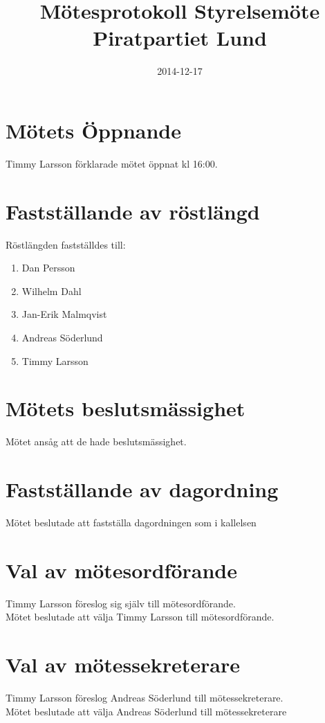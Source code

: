 \documentclass[a4paper,10pt]{article}
\title{\vspace{-1.5in}\textmd{\textbf{Mötesprotokoll Styrelsemöte Piratpartiet Lund}}}
\date{2014-12-17}
\author{}
\begin{document}
\maketitle

\section{Mötets Öppnande}
Timmy Larsson förklarade mötet öppnat kl 16:00.

\section{Fastställande av röstlängd}
Röstlängden fastställdes till:
\begin{enumerate}
\item Dan Persson
\item Wilhelm Dahl
\item Jan-Erik Malmqvist
\item Andreas Söderlund
\item Timmy Larsson
\end{enumerate}

\section{Mötets beslutsmässighet}
Mötet ansåg att de hade beslutsmässighet.

\section{Fastställande av dagordning}
Mötet beslutade att fastställa dagordningen som i kallelsen

\newpage

\section{Val av mötesordförande}
Timmy Larsson föreslog sig själv till mötesordförande.\\
Mötet beslutade att välja Timmy Larsson till mötesordförande.

\section{Val av mötessekreterare}
Timmy Larsson föreslog Andreas Söderlund till mötessekreterare.\\
Mötet beslutade att välja Andreas Söderlund till mötessekreterare
\end{document}
